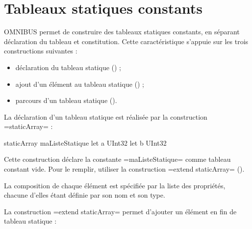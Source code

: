 




\chapter{Tableaux statiques constants}

OMNIBUS permet de construire des tableaux statiques constants, en séparant déclaration du tableau et constitution. Cette caractéristique s'appuie sur les trois constructions suivantes :
\begin{itemize}
  \item déclaration du tableau statique () ;
  \item ajout d'un élément au tableau statique () ;
  \item parcours d'un tableau statique ().
\end{itemize}












La déclaration d'un tableau statique est réalisée par la construction \omnibus=staticArray= :

\begin{OMNIBUS}
staticArray maListeStatique {
  let a UInt32
  let b UInt32
}
\end{OMNIBUS}

Cette construction déclare la constante \omnibus=maListeStatique= comme tableau constant vide. Pour le remplir, utiliser la construction \omnibus=extend staticArray= ().

La composition de chaque élément est spécifiée par la liste des propriétés, chacune d'elles étant définie par son nom et son type.










La construction \omnibus=extend staticArray= permet d'ajouter un élément en fin de tableau statique :

